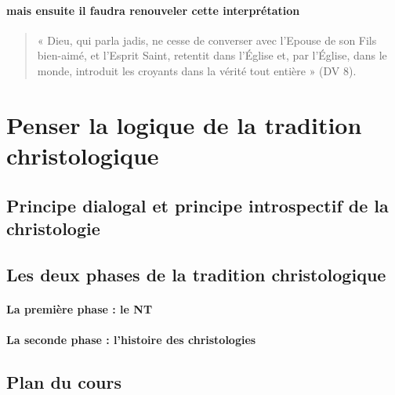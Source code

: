 \paragraph{mais ensuite il faudra renouveler cette interprétation}
  \begin{quote}
      «  Dieu,  qui  parla  jadis,  ne  cesse  de  converser  avec  l’Epouse  de  son  Fils  bien-aimé,  et  l’Esprit Saint,  retentit  dans  l’Église  et,  par  l’Église,  dans  le  monde,  introduit  les  croyants  dans  la  vérité tout  entière  »  (DV  8). 
  \end{quote}

  \section{Penser la logique de la tradition
  christologique}

  
  
  
    
    \subsection{Principe dialogal et principe introspectif de la christologie}
    
  
    
    \subsection{Les deux phases de la tradition christologique}
    

    
      
      \paragraph{La première phase : le NT}
      
    
      
      \paragraph{La seconde phase : l'histoire des christologies}
      
    
  
    
    \subsection{Plan du cours}
    
